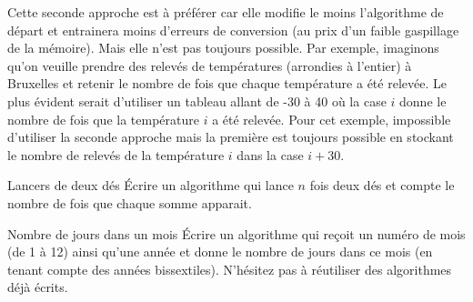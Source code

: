 		Cette seconde approche est à préférer 
		car elle modifie le moins l’algorithme de départ 
		et entrainera moins d’erreurs de conversion
		(au prix d’un faible gaspillage de la mémoire).
		Mais elle n’est pas toujours possible.
		Par exemple, imaginons qu’on veuille prendre 
		des relevés de températures (arrondies à l’entier) à Bruxelles 
		et retenir le nombre de fois que chaque température a été relevée.
		Le plus évident serait d’utiliser un tableau allant de -30 à 40
		où la case $i$ donne le nombre de fois 
		que la température $i$ a été relevée.
		Pour cet exemple, impossible d’utiliser la seconde approche
		mais la première est toujours possible en stockant
		le nombre de relevés de la température $i$ dans la case $i+30$.

		\begin{Exercice}{Lancers de deux dés}
			Écrire un algorithme qui lance $n$ fois deux dés
			et compte le nombre de fois que chaque somme apparait.
			\begin{LDA}
			\end{LDA}
		\end{Exercice}
			
		\begin{Exercice}{Nombre de jours dans un mois}
			Écrire un algorithme qui reçoit un numéro de mois (de 1 à 12)
			ainsi qu’une année et donne le nombre de jours dans ce mois
			(en tenant compte des années bissextiles).
			N’hésitez pas à réutiliser des algorithmes déjà écrits.
		\end{Exercice}
		
		
